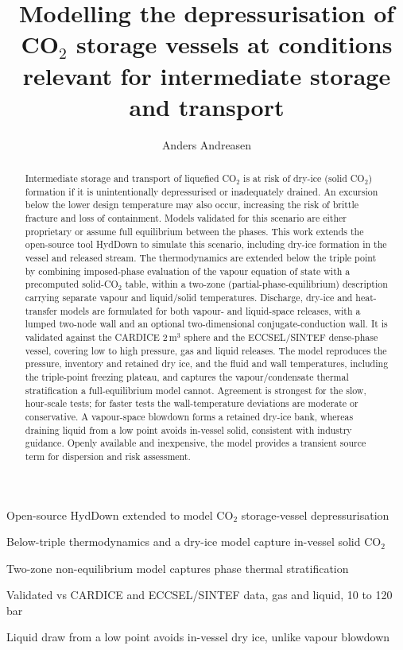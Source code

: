 \documentclass[5p,authoryear]{elsarticle}
\begin{document}
\begin{frontmatter}

\title{Modelling the depressurisation of CO$_2$ storage vessels at conditions
relevant for intermediate storage and transport}

\author[ors]{Anders Andreasen}
\address[ors]{ORS Consulting Aps, Borgergade 66 st th., DK-6700 Esbjerg, Denmark}

\begin{highlights}
\item Open-source HydDown extended to model CO$_2$ storage-vessel depressurisation
\item Below-triple thermodynamics and a dry-ice model capture in-vessel solid CO$_2$
\item Two-zone non-equilibrium model captures phase thermal stratification
\item Validated vs CARDICE and ECCSEL/SINTEF data, gas and liquid, 10 to 120 bar
\item Liquid draw from a low point avoids in-vessel dry ice, unlike vapour blowdown
\end{highlights}

\begin{abstract}
Intermediate storage and transport of liquefied CO$_2$ is at risk of dry-ice (solid CO$_2$)
formation if it is unintentionally depressurised or inadequately drained. An excursion below the
lower design temperature may also occur, increasing the risk of brittle fracture and loss of
containment. Models validated for this scenario are either proprietary or assume full equilibrium
between the phases. This work extends the open-source tool HydDown to simulate this scenario, including dry-ice
formation in the vessel and released stream. The thermodynamics are extended below the triple point
by combining imposed-phase evaluation of the vapour equation of state with a precomputed
solid-CO$_2$ table, within a two-zone (partial-phase-equilibrium) description carrying separate
vapour and liquid/solid temperatures. Discharge, dry-ice and heat-transfer models are formulated for
both vapour- and liquid-space releases, with a lumped two-node wall and an optional two-dimensional
conjugate-conduction wall. It is validated against the CARDICE 2\,m$^3$ sphere and the ECCSEL/SINTEF
dense-phase vessel, covering low to high pressure, gas and liquid releases. The model reproduces
the pressure, inventory and retained dry ice, and the fluid and wall temperatures, including the
triple-point freezing plateau, and captures the vapour/condensate thermal stratification a
full-equilibrium model cannot. Agreement is strongest for the slow, hour-scale tests; for faster
tests the wall-temperature deviations are moderate or conservative. A vapour-space
blowdown forms a retained dry-ice bank, whereas draining liquid from a low point avoids in-vessel
solid, consistent with industry guidance. Openly available and inexpensive, the model provides a
transient source term for dispersion and risk assessment.
\end{abstract}


\end{frontmatter}
\end{document}
